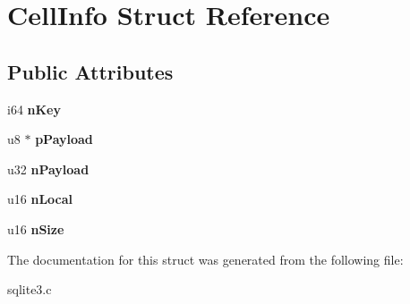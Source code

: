 \hypertarget{structCellInfo}{}\section{Cell\+Info Struct Reference}
\label{structCellInfo}
\subsection*{Public Attributes}
\begin{DoxyCompactItemize}
\item 
i64 {\bfseries n\+Key}\hypertarget{structCellInfo_a542b041b9a54a13f7c6f2fe63e7542c0}{}\label{structCellInfo_a542b041b9a54a13f7c6f2fe63e7542c0}

\item 
u8 $\ast$ {\bfseries p\+Payload}\hypertarget{structCellInfo_abbcd805bfcc10bed2ff5b81aae466940}{}\label{structCellInfo_abbcd805bfcc10bed2ff5b81aae466940}

\item 
u32 {\bfseries n\+Payload}\hypertarget{structCellInfo_ac1e3c1b4216a8e778bbac82907bb1485}{}\label{structCellInfo_ac1e3c1b4216a8e778bbac82907bb1485}

\item 
u16 {\bfseries n\+Local}\hypertarget{structCellInfo_a8cedbcc2c94916fe5798b502c614bb08}{}\label{structCellInfo_a8cedbcc2c94916fe5798b502c614bb08}

\item 
u16 {\bfseries n\+Size}\hypertarget{structCellInfo_ace78ab5eb5337b686e31b895feeb0562}{}\label{structCellInfo_ace78ab5eb5337b686e31b895feeb0562}

\end{DoxyCompactItemize}


The documentation for this struct was generated from the following file\+:\begin{DoxyCompactItemize}
\item 
sqlite3.\+c\end{DoxyCompactItemize}
